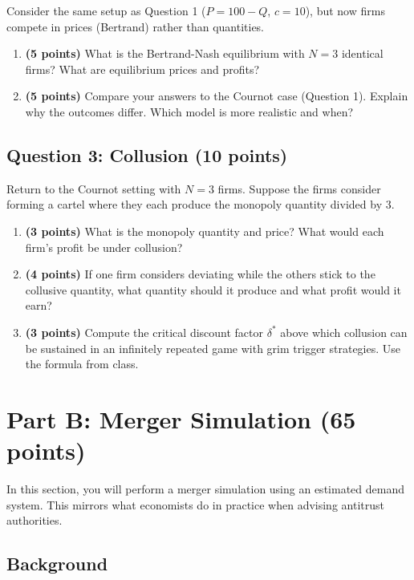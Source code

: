 \documentclass[11pt]{article}
\begin{document}
Consider the same setup as Question 1 ($P = 100 - Q$, $c = 10$), but now firms compete in prices (Bertrand) rather than quantities.

\begin{enumerate}
\item \textbf{(5 points)} What is the Bertrand-Nash equilibrium with $N = 3$ identical firms? What are equilibrium prices and profits?

\item \textbf{(5 points)} Compare your answers to the Cournot case (Question 1). Explain why the outcomes differ. Which model is more realistic and when?
\end{enumerate}

\subsection*{Question 3: Collusion (10 points)}

Return to the Cournot setting with $N = 3$ firms. Suppose the firms consider forming a cartel where they each produce the monopoly quantity divided by 3.

\begin{enumerate}
\item \textbf{(3 points)} What is the monopoly quantity and price? What would each firm's profit be under collusion?

\item \textbf{(4 points)} If one firm considers deviating while the others stick to the collusive quantity, what quantity should it produce and what profit would it earn?

\item \textbf{(3 points)} Compute the critical discount factor $\delta^*$ above which collusion can be sustained in an infinitely repeated game with grim trigger strategies. Use the formula from class.
\end{enumerate}

\newpage
\section*{Part B: Merger Simulation (65 points)}

In this section, you will perform a merger simulation using an estimated demand system. This mirrors what economists do in practice when advising antitrust authorities.

\subsection*{Background}
\end{document}
